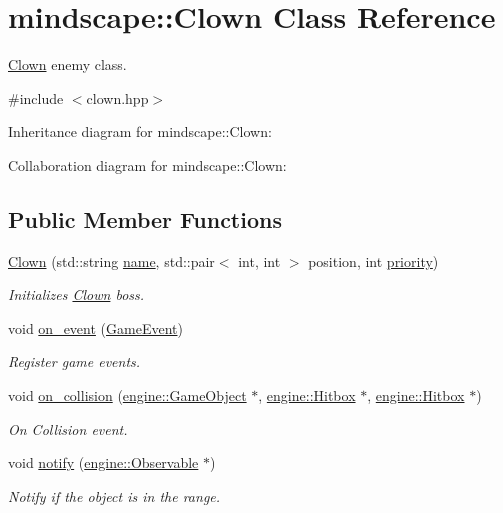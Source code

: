 \hypertarget{classmindscape_1_1_clown}{}\section{mindscape\+:\+:Clown Class Reference}
\label{classmindscape_1_1_clown}


\hyperlink{classmindscape_1_1_clown}{Clown} enemy class.  




{\ttfamily \#include $<$clown.\+hpp$>$}



Inheritance diagram for mindscape\+:\+:Clown\+:


Collaboration diagram for mindscape\+:\+:Clown\+:
\subsection*{Public Member Functions}
\begin{DoxyCompactItemize}
\item 
\hyperlink{classmindscape_1_1_clown_a193ba548dc86723e9f9dc3837b303dcf}{Clown} (std\+::string \hyperlink{classengine_1_1_game_object_a1f104f7af4f351e6d3278319762c9fe5}{name}, std\+::pair$<$ int, int $>$ position, int \hyperlink{classengine_1_1_game_object_a159ecaca30229e302793b11a75bd13c2}{priority})
\begin{DoxyCompactList}\small\item\em Initializes \hyperlink{classmindscape_1_1_clown}{Clown} boss. \end{DoxyCompactList}\item 
void \hyperlink{classmindscape_1_1_clown_a54e259fdb78e80ea53b8ff2c9c4d7e13}{on\+\_\+event} (\hyperlink{class_game_event}{Game\+Event})
\begin{DoxyCompactList}\small\item\em Register game events. \end{DoxyCompactList}\item 
void \hyperlink{classmindscape_1_1_clown_a738d25a413d4c112e4e98ef3d9da8520}{on\+\_\+collision} (\hyperlink{classengine_1_1_game_object}{engine\+::\+Game\+Object} $\ast$, \hyperlink{classengine_1_1_hitbox}{engine\+::\+Hitbox} $\ast$, \hyperlink{classengine_1_1_hitbox}{engine\+::\+Hitbox} $\ast$)
\begin{DoxyCompactList}\small\item\em On Collision event. \end{DoxyCompactList}\item 
void \hyperlink{classmindscape_1_1_clown_a0c5d3fc9f693402084cbcbc1b7110124}{notify} (\hyperlink{classengine_1_1_observable}{engine\+::\+Observable} $\ast$)
\begin{DoxyCompactList}\small\item\em Notify if the object is in the range. \end{DoxyCompactList}\end{DoxyCompactItemize}
